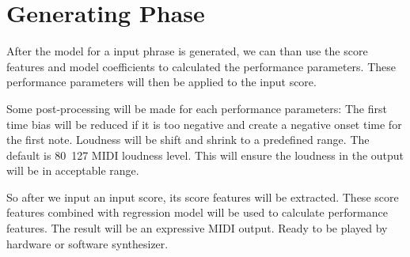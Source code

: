    \section{Generating Phase}
      After the model for a input phrase is generated, we can than use the score features and model coefficients to calculated the performance parameters. These performance parameters will then be applied to the input score.
      
      Some post-processing will be made for each performance parameters: The first time bias will be reduced if it is too negative and create a negative onset time for the first note. Loudness will be shift and shrink to a predefined range. The default is 80~127 MIDI loudness level. This will ensure the loudness in the output will be in acceptable range. 
      
 So after we input an input score, its score features will be extracted. These score features combined with regression model will be used to calculate performance features. The result will be an expressive MIDI output. Ready to be played by hardware or software synthesizer.  
   
